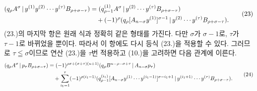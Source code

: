 \begin{equation}
\begin{aligned}
(q_\rho A^\sigma\,|\,y^{(1)}y^{(2)}\cdots y^{(\tau)}B_{\rho+\sigma-\tau})
&=(q_{\rho-1}^{(1)}A^\sigma\,|\,y^{(2)}\cdots y^{(\tau)}B_{\rho+\sigma-\tau})\\
&\quad+(-1)^\rho(q_\rho[A_{n-\sigma}y^{(1)}]^{\sigma-1}\,|\,y^{(2)}\cdots y^{(\tau)}B_{\rho+\sigma-\tau}).
\end{aligned}
\tag{23}
\end{equation}
(23.)의 마지막 항은 원래 식과 정확히 같은 형태를 가진다. 다만 $\sigma$가 $\sigma-1$로, $\tau$가 $\tau-1$로 바뀌었을 뿐이다. 따라서 이 항에도 다시 등식 (23.)을 적용할 수 있다. 그러므로 $\tau\leqq\sigma$이므로 연산 (23.)을 $\tau$번 적용하고 (10.)을 고려하면 다음 관계에 이른다.
\begin{equation}
\begin{aligned}
(q_\rho A^\sigma\,|\,p_\tau B_{\rho+\sigma-\tau})
&=(-1)^{\rho\sigma+(\sigma+\tau)(n+1)}
  (q_\rho B^{n-\rho-\sigma+\tau}\,|\,A_{n-\sigma}p_\tau)\\
&\quad+\sum_{i_1=1}^{\tau}(-1)^{\rho(i_1-1)}
 (q_{\rho-1}^{(i_1)}[A_{n-\sigma}y^{(1)}\cdots y^{(i_1-1)}]^{\sigma-i_1+1}\,|\,y^{(i_1+1)}\cdots y^{(\tau)}B_{\rho+\sigma-\tau}).
\end{aligned}
\tag{24}
\end{equation}

